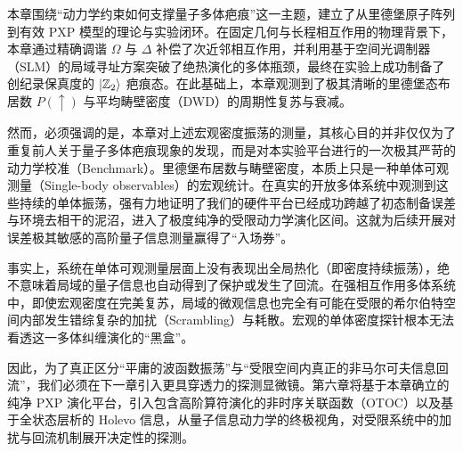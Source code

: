 \documentclass[../main.tex]{subfiles}
\begin{document}

本章围绕“动力学约束如何支撑量子多体疤痕”这一主题，建立了从里德堡原子阵列到有效 PXP 模型的理论与实验闭环。在固定几何与长程相互作用的物理背景下，本章通过精确调谐 $\Omega$ 与 $\Delta$ 补偿了次近邻相互作用，并利用基于空间光调制器（SLM）的局域寻址方案突破了绝热演化的多体瓶颈，最终在实验上成功制备了创纪录保真度的 $\ket{\mathbb{Z}_2}$ 疤痕态。在此基础上，本章观测到了极其清晰的里德堡态布居数 $P(\uparrow)$ 与平均畴壁密度（DWD）的周期性复苏与衰减。

然而，必须强调的是，本章对上述宏观密度振荡的测量，其核心目的并非仅仅为了重复前人关于量子多体疤痕现象的发现，而是对本实验平台进行的一次极其严苛的动力学校准（Benchmark）。里德堡布居数与畴壁密度，本质上只是一种单体可观测量（Single-body observables）的宏观统计。在真实的开放多体系统中观测到这些持续的单体振荡，强有力地证明了我们的硬件平台已经成功跨越了初态制备误差与环境去相干的泥沼，进入了极度纯净的受限动力学演化区间。这就为后续开展对误差极其敏感的高阶量子信息测量赢得了“入场券”。

事实上，系统在单体可观测量层面上没有表现出全局热化（即密度持续振荡），绝不意味着局域的量子信息也自动得到了保护或发生了回流。在强相互作用多体系统中，即使宏观密度在完美复苏，局域的微观信息也完全有可能在受限的希尔伯特空间内部发生错综复杂的加扰（Scrambling）与耗散。宏观的单体密度探针根本无法看透这一多体纠缠演化的“黑盒”。

因此，为了真正区分“平庸的波函数振荡”与“受限空间内真正的非马尔可夫信息回流”，我们必须在下一章引入更具穿透力的探测显微镜。第六章将基于本章确立的纯净 PXP 演化平台，引入包含高阶算符演化的非时序关联函数（OTOC）以及基于全状态层析的 Holevo 信息，从量子信息动力学的终极视角，对受限系统中的加扰与回流机制展开决定性的探测。


\newpage

\end{document}
